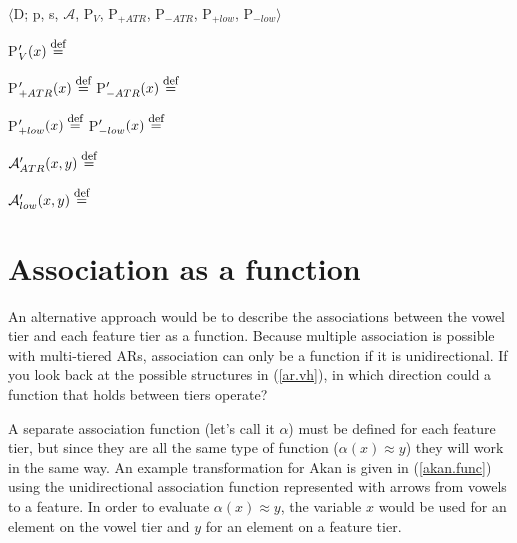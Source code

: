 \documentclass[,doc,floatsintext]{apa6}
\def\defeq{\mathrel{\buildrel \mbox{\footnotesize def} \over =}}
\theoremstyle{definition}
\theoremstyle{definition}
\theoremstyle{definition}
\theoremstyle{remark}
\begin{document}
\begin{exe}
\ex\label{qflfp.spread} $\langle$D; p, s, $\mathcal{A}$, P$_V$, P$_{+ATR}$, P$_{-ATR}$, P$_{+low}$, P$_{-low}\rangle$ 
\end{exe}

P\('_{V}(x) \defeq\) \vspace{0.5in}

P\('_{+ATR}(x) \defeq\) \hspace{2.25in} P\('_{-ATR}(x) \defeq\)
\vspace{0.5in}

P\('_{+low}(x) \defeq\) \hspace{2.25in} P\('_{-low}(x) \defeq\)
\vspace{0.5in}

\(\mathcal{A}_{ATR}'(x, y) \defeq\) \vspace{0.5in}

\(\mathcal{A}_{low}'(x, y) \defeq\) \vspace{0.5in}

\section{Association as a function}\label{association-as-a-function}

An alternative approach would be to describe the associations between
the vowel tier and each feature tier as a function. Because multiple
association is possible with multi-tiered ARs, association can only be a
function if it is unidirectional. If you look back at the possible
structures in (\ref{ar.vh}), in which direction could a function that
holds between tiers operate?

A separate association function (let's call it \(\alpha\)) must be
defined for each feature tier, but since they are all the same type of
function (\(\alpha(x)\approx y\)) they will work in the same way. An
example transformation for Akan is given in (\ref{akan.func}) using the
unidirectional association function represented with arrows from vowels
to a feature. In order to evaluate \(\alpha(x)\approx y\), the variable
\(x\) would be used for an element on the vowel tier and \(y\) for an
element on a feature tier.
\end{document}
